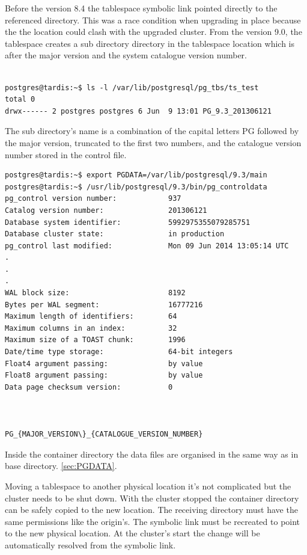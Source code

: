 Before the version 8.4 the tablespace symbolic link pointed directly to the referenced directory. This was 
a race condition when upgrading in place because the the location could clash with the upgraded cluster. 
From the version 9.0, the tablespace creates a sub directory directory in the tablespace location which 
is after the major version and the system catalogue version number. 
\newline

\begin{verbatim}

postgres@tardis:~$ ls -l /var/lib/postgresql/pg_tbs/ts_test
total 0
drwx------ 2 postgres postgres 6 Jun  9 13:01 PG_9.3_201306121

\end{verbatim}

The sub directory's name is a combination of the capital letters PG followed by the major version, 
truncated to the first two numbers, and the catalogue version number stored in the control file.\newline



\begin{verbatim}
postgres@tardis:~$ export PGDATA=/var/lib/postgresql/9.3/main
postgres@tardis:~$ /usr/lib/postgresql/9.3/bin/pg_controldata 
pg_control version number:            937
Catalog version number:               201306121
Database system identifier:           5992975355079285751
Database cluster state:               in production
pg_control last modified:             Mon 09 Jun 2014 13:05:14 UTC
.
.
.
WAL block size:                       8192
Bytes per WAL segment:                16777216
Maximum length of identifiers:        64
Maximum columns in an index:          32
Maximum size of a TOAST chunk:        1996
Date/time type storage:               64-bit integers
Float4 argument passing:              by value
Float8 argument passing:              by value
Data page checksum version:           0



PG_{MAJOR_VERSION\}_{CATALOGUE_VERSION_NUMBER}

\end{verbatim}



Inside the container directory the data files are organised in the same way as in base directory.
\ref{sec:PGDATA}.\newline

Moving a tablespace to another physical location it's not complicated but the cluster needs to be shut down.
With the cluster stopped the container directory can be safely copied to the new location. The receiving 
directory must have the same permissions  like the origin's. The symbolic link must be recreated to point 
to the new physical location. At the cluster's start the change will be automatically resolved from 
the symbolic link.\newline

